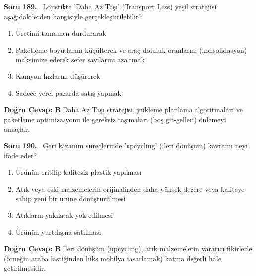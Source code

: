 \documentclass[11pt,a4paper,openany]{book}
\begin{document}
\needspace{5cm}
\vspace{8pt}
\noindent\textbf{\large\sffamily Soru 189.} \ Lojistikte 'Daha Az Taşı' (Transport Less) yeşil stratejisi aşağıdakilerden hangisiyle gerçekleştirilebilir?
\begin{enumerate}[label=\Alph*), leftmargin=25pt, topsep=4pt, itemsep=2pt]
    \item Üretimi tamamen durdurarak
    \item Paketleme boyutlarını küçülterek ve araç doluluk oranlarını (konsolidasyon) maksimize ederek sefer sayılarını azaltmak
    \item Kamyon hızlarını düşürerek
    \item Sadece yerel pazarda satış yapmak
\end{enumerate}
\vspace{4pt}
\begin{tcolorbox}[title=Cevap ve Açıklama, colback=gray!3!white, colframe=primarycolor!90!black, arc=2mm, fonttitle=\bfseries\sffamily, top=6pt, bottom=6pt]
    \textbf{Doğru Cevap: B}
    \vspace{2pt}
    Daha Az Taşı stratejisi, yükleme planlama algoritmaları ve paketleme optimizasyonu ile gereksiz taşımaları (boş git-gelleri) önlemeyi amaçlar.
\end{tcolorbox}
\vspace{10pt}

\needspace{5cm}
\vspace{8pt}
\noindent\textbf{\large\sffamily Soru 190.} \ Geri kazanım süreçlerinde 'upcycling' (ileri dönüşüm) kavramı neyi ifade eder?
\begin{enumerate}[label=\Alph*), leftmargin=25pt, topsep=4pt, itemsep=2pt]
    \item Ürünün eritilip kalitesiz plastik yapılması
    \item Atık veya eski malzemelerin orijinalinden daha yüksek değere veya kaliteye sahip yeni bir ürüne dönüştürülmesi
    \item Atıkların yakılarak yok edilmesi
    \item Ürünün yurtdışına satılması
\end{enumerate}
\vspace{4pt}
\begin{tcolorbox}[title=Cevap ve Açıklama, colback=gray!3!white, colframe=primarycolor!90!black, arc=2mm, fonttitle=\bfseries\sffamily, top=6pt, bottom=6pt]
    \textbf{Doğru Cevap: B}
    \vspace{2pt}
    İleri dönüşüm (upcycling), atık malzemelerin yaratıcı fikirlerle (örneğin araba lastiğinden lüks mobilya tasarlamak) katma değerli hale getirilmesidir.
\end{tcolorbox}
\vspace{10pt}
\end{document}
